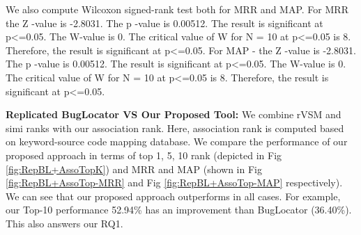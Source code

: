 \documentclass[conference]{IEEEtran}
\begin{document}
We also compute Wilcoxon signed-rank test both for MRR and MAP. For MRR the {Z} -value is -2.8031. The {p} -value is 0.00512. The result is significant at p<=0.05. The W-value is 0. The critical value of W for N = 10 at p<=0.05 is 8. Therefore, the result is significant at p<=0.05.
For MAP - the {Z} -value is -2.8031. The {p} -value is 0.00512. The result is significant at p<=0.05. The W-value is 0. The critical value of W for N = 10 at p<=0.05 is 8. Therefore, the result is significant at p<=0.05.


\textbf{Replicated BugLocator VS Our Proposed Tool:}
We combine rVSM and simi ranks with our association rank. Here, association rank is computed based on keyword-source code mapping database. We compare the performance of our proposed approach in terms of top 1, 5, 10 rank (depicted in Fig \ref{fig:RepBL+AssoTopK}) and MRR and MAP (shown in Fig \ref{fig:RepBL+AssoTop-MRR} and Fig \ref{fig:RepBL+AssoTop-MAP} respectively). We can see that our proposed approach outperforms in all cases. For example, our Top-10 performance 52.94\% has an improvement than BugLocator (36.40\%). This also answers our RQ1.
\end{document}
